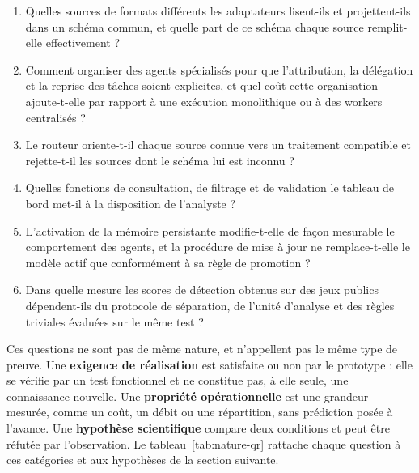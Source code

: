 \begin{enumerate}[label=\textbf{QR\arabic*.}, leftmargin=1.6cm]

    \item Quelles sources de formats différents les adaptateurs lisent-ils et projettent-ils dans un schéma commun, et quelle part de ce schéma chaque source remplit-elle effectivement ?

    \item Comment organiser des agents spécialisés pour que l'attribution, la délégation et la reprise des tâches soient explicites, et quel coût cette organisation ajoute-t-elle par rapport à une exécution monolithique ou à des workers centralisés ?

    \item Le routeur oriente-t-il chaque source connue vers un traitement compatible et rejette-t-il les sources dont le schéma lui est inconnu ?

    \item Quelles fonctions de consultation, de filtrage et de validation le tableau de bord met-il à la disposition de l'analyste ?

    \item L'activation de la mémoire persistante modifie-t-elle de façon mesurable le comportement des agents, et la procédure de mise à jour ne remplace-t-elle le modèle actif que conformément à sa règle de promotion ?

    \item Dans quelle mesure les scores de détection obtenus sur des jeux publics dépendent-ils du protocole de séparation, de l'unité d'analyse et des règles triviales évaluées sur le même test ?

\end{enumerate}

Ces questions ne sont pas de même nature, et n'appellent pas le même type de preuve. Une \textbf{exigence de réalisation} est satisfaite ou non par le prototype : elle se vérifie par un test fonctionnel et ne constitue pas, à elle seule, une connaissance nouvelle. Une \textbf{propriété opérationnelle} est une grandeur mesurée, comme un coût, un débit ou une répartition, sans prédiction posée à l'avance. Une \textbf{hypothèse scientifique} compare deux conditions et peut être réfutée par l'observation. Le tableau~\ref{tab:nature-qr} rattache chaque question à ces catégories et aux hypothèses de la section suivante.

